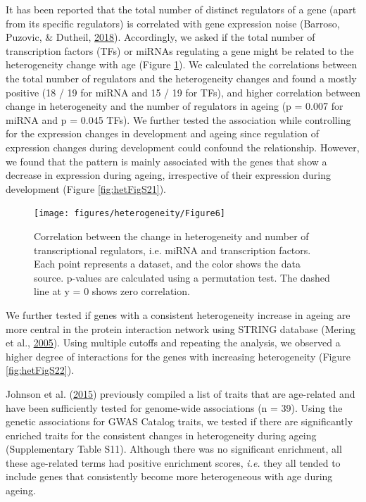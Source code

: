 \documentclass[12pt,twoside]{unicam}
\begin{document}
It has been reported that the total number of distinct regulators of a gene (apart from its specific regulators) is correlated with gene expression noise (Barroso, Puzovic, \& Dutheil, \protect\hyperlink{ref-Barroso2018}{2018}). Accordingly, we asked if the total number of transcription factors (TFs) or miRNAs regulating a gene might be related to the heterogeneity change with age (Figure \ref{fig:hetFig6}). We calculated the correlations between the total number of regulators and the heterogeneity changes and found a mostly positive (18 / 19 for miRNA and 15 / 19 for TFs), and higher correlation between change in heterogeneity and the number of regulators in ageing (p = 0.007 for miRNA and p = 0.045 TFs). We further tested the association while controlling for the expression changes in development and ageing since regulation of expression changes during development could confound the relationship. However, we found that the pattern is mainly associated with the genes that show a decrease in expression during ageing, irrespective of their expression during development (Figure \ref{fig:hetFigS21}).

\begin{figure}

{\centering \texttt{[image: figures/heterogeneity/Figure6]} 

}

\caption[Correlation between the change in heterogeneity and number of transcriptional regulators.]{Correlation between the change in heterogeneity and number of transcriptional regulators, i.e. miRNA and transcription factors. Each point represents a dataset, and the color shows the data source. p-values are calculated using a permutation test. The dashed line at y = 0 shows zero correlation.}\label{fig:hetFig6}
\end{figure}

We further tested if genes with a consistent heterogeneity increase in ageing are more central in the protein interaction network using STRING database (Mering et al., \protect\hyperlink{ref-VonMering2005}{2005}). Using multiple cutoffs and repeating the analysis, we observed a higher degree of interactions for the genes with increasing heterogeneity (Figure \ref{fig:hetFigS22}).

Johnson et al. (\protect\hyperlink{ref-Johnson2015}{2015}) previously compiled a list of traits that are age-related and have been sufficiently tested for genome-wide associations (n = 39). Using the genetic associations for GWAS Catalog traits, we tested if there are significantly enriched traits for the consistent changes in heterogeneity during ageing (Supplementary Table S11). Although there was no significant enrichment, all these age-related terms had positive enrichment scores, \emph{i.e.} they all tended to include genes that consistently become more heterogeneous with age during ageing.
\end{document}
